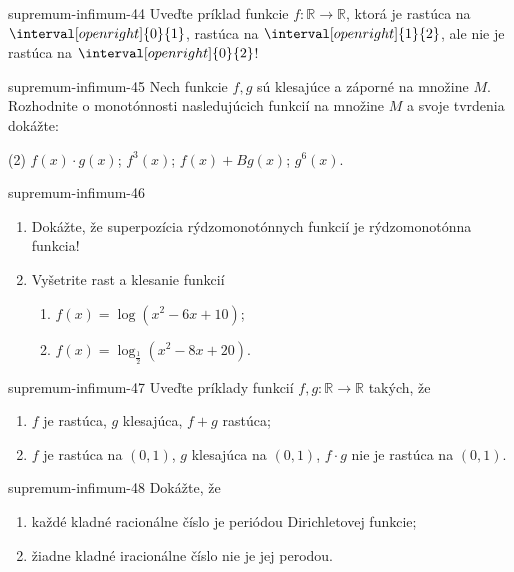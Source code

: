 \begin{defproblem}{supremum-infimum-44}
Uveďte príklad funkcie $f:\mathbb{R} \rightarrow \mathbb{R}$, ktorá je rastúca
na $\interval[open right]{0}{1}$, rastúca na $\interval[open right]{1}{2}$, ale
nie je rastúca na $\interval[open right]{0}{2}$!
\end{defproblem}

\begin{defproblem}{supremum-infimum-45}
Nech funkcie $f,g$ sú klesajúce a záporné na množine $M$. Rozhodnite o monotónnosti nasledujúcich funkcií na množine $M$ a svoje tvrdenia dokážte:
\begin{tasks}(2)
  \task $f(x)\cdot g(x)$;
  \task $f^3(x)$;
  \task $f(x)+Bg(x)$;
  \task $g^6(x)$.
\end{tasks}
\end{defproblem}

\begin{defproblem}{supremum-infimum-46}
\begin{enumerate}
\item Dokážte, že superpozícia rýdzomonotónnych funkcií je rýdzomonotónna funkcia!
\item Vyšetrite rast a klesanie funkcií
\begin{enumerate}
\item $f(x)=\log (x^2-6x+10)$;
\item $f(x)=\log_\frac{1}{2}(x^2-8x+20)$.
\end{enumerate}
\end{enumerate}
\end{defproblem}

\begin{defproblem}{supremum-infimum-47}
Uveďte príklady funkcií $f,g:\mathbb{R}\rightarrow\mathbb{R}$ takých, že
\begin{enumerate}
\item $f$ je rastúca, $g$ klesajúca, $f+g$ rastúca;
\item $f$ je rastúca na $(0,1)$, $g$ klesajúca na $(0,1)$, $f\cdot g$ nie je rastúca na $(0,1)$.
\end{enumerate}
\end{defproblem}

\begin{defproblem}{supremum-infimum-48}
Dokážte, že
\begin{enumerate}
\item každé kladné racionálne číslo je periódou Dirichletovej funkcie;
\item žiadne kladné iracionálne číslo nie je jej perodou.
\end{enumerate}
\end{defproblem}

